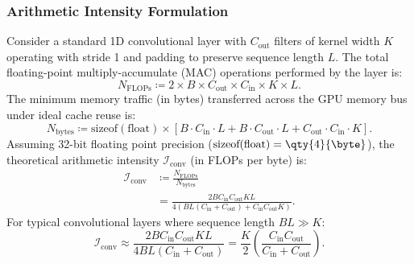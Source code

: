 \subsubsection*{Arithmetic Intensity Formulation}
Consider a standard 1D convolutional layer with $C_{\mathrm{out}}$
filters of kernel width $K$
operating with stride \num{1} and padding to preserve sequence length $L$.
The total floating-point multiply-accumulate (MAC) operations
performed by the layer is:
\begin{equation}
  N_{\mathrm{FLOPs}} \coloneqq 2 \times B \times C_{\mathrm{out}}
  \times C_{\mathrm{in}} \times K \times L.
  \label{eq:supp_conv_flops}
\end{equation}
The minimum memory traffic (in bytes) transferred across the GPU
memory bus under ideal cache reuse is:
\begin{equation}
  N_{\mathrm{bytes}} \coloneqq \text{sizeof}(\mathrm{float}) \times
  \left[ B \cdot C_{\mathrm{in}} \cdot L + B \cdot C_{\mathrm{out}}
  \cdot L + C_{\mathrm{out}} \cdot C_{\mathrm{in}} \cdot K \right].
  \label{eq:supp_conv_bytes}
\end{equation}
Assuming 32-bit floating point precision
($\text{sizeof}(\mathrm{float}) = \qty{4}{\byte}$),
the theoretical arithmetic intensity $\mathcal{I}_{\mathrm{conv}}$
(in FLOPs per byte) is:
\begin{align}
  \mathcal{I}_{\mathrm{conv}}
  &\coloneqq \frac{N_{\mathrm{FLOPs}}}{N_{\mathrm{bytes}}}
  \label{eq:supp_arith_intensity_def} \\
  &= \frac{2 B C_{\mathrm{in}} C_{\mathrm{out}} K L}{4 \left( B L
      (C_{\mathrm{in}} + C_{\mathrm{out}}) + C_{\mathrm{in}}
  C_{\mathrm{out}} K \right)}.
  \label{eq:supp_arith_intensity_fraction}
\end{align}
For typical convolutional layers where sequence length $B L \gg K$:
\begin{equation}
  \mathcal{I}_{\mathrm{conv}} \approx \frac{2 B C_{\mathrm{in}}
  C_{\mathrm{out}} K L}{4 B L (C_{\mathrm{in}} + C_{\mathrm{out}})}
  = \frac{K}{2} \left( \frac{C_{\mathrm{in}}
  C_{\mathrm{out}}}{C_{\mathrm{in}} + C_{\mathrm{out}}} \right).
  \label{eq:supp_arith_intensity_approx}
\end{equation}

